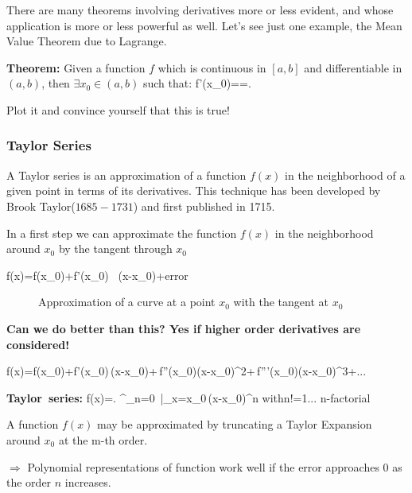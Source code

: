 There are many theorems involving derivatives more or less evident, and whose application is more or less powerful as well. Let's see just one example, the Mean Value Theorem due to Lagrange. 

{\bf Theorem:} Given a function $f$ which is continuous in $[a,b]$ and differentiable in $(a,b)$, then $\exists x_0 \in (a,b)$ such that:
\bnn
	f'(x_0)==\tan \alpha.
\enn

Plot it and convince yourself that this is true!

\subsubsection{Taylor Series}\label{taylor}

A Taylor series is an approximation of a function $f(x)$ in the neighborhood of a given point in terms of its derivatives. This technique has been developed by Brook Taylor($1685-1731$) and first published in 1715.

In a first step we can approximate the function $f(x)$ in the neighborhood around $x_0$ by the tangent through $x_0$

\bnn f(x)=f(x_{0})+f'(x_{0}) \, (x-x_{0})+\mbox{error}
\enn

\begin{figure}[!h]

    \centerline{\epsfxsize=12cm  }

    \caption{Approximation of a curve at a point $x_0$ with the tangent at $x_0$} \label{fig58}

\end{figure} \vs \vs

\centerline{\bf Can we do better than this? Yes if higher order derivatives are considered!}

\bnn f(x)=f(x_{0})+f'(x_0)\,(x-x_0)+\,f''(x_0)(x-x_0)^2+\,f'''(x_{0})(x-x_{0})^{3}+... \enn

\bnn
    \mbox{\bf Taylor series:} \qquad f(x)=\left. \sum^{\infty}_{n=0}
    \,\right|_{x=x_0}\,(x-x_0)^n \qquad
    \mbox{with}\quad n!=1\cdot ... \;\;\;\mbox{n-factorial}
\enn

A function $f(x)$ may be approximated by truncating a Taylor Expansion
around $x_{0}$ at the m-th order.

$\Rightarrow$ Polynomial representations of function work well if the error approaches $0$ as the order $n$ increases.

